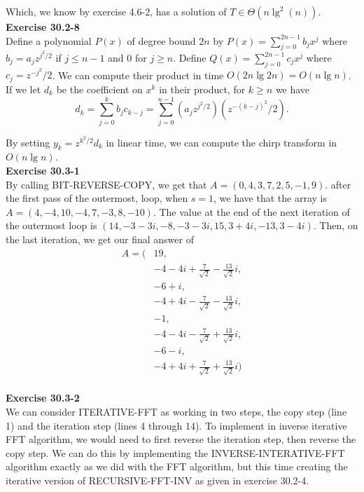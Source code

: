 \documentclass{article}
\begin{document}
Which, we know by exercise 4.6-2, has a solution of $T\in \Theta(n\lg^2(n))$.\\

\noindent\textbf{Exercise 30.2-8}\\

Define a polynomial $P(x)$ of degree bound $2n$ by $P(x) = \sum_{j=0}^{2n-1} b_jx^j$ where $b_j = a_jz^{j^2/2}$ if $j \leq n-1$ and 0 for $j  \geq n$. Define $Q(x) = \sum_{j=0}^{2n-1} c_jx^j$ where $c_j = z^{-j^2}/2$.  We can compute their product in time $O(2n\lg 2n) = O(n \lg n)$. If we let $d_k$ be the coefficient on $x^k$ in their product, for $k \geq n$ we have  
\[d_k = \sum_{j=0}^k b_j c_{k-j} = \sum_{j=0}^{n-1}\left(a_jz^{j^2/2}\right)\left(z^{-(k-j)^2}/2\right).\]

By setting $y_k = z^{k^2/2}d_k$ in linear time, we can compute the chirp transform in $O(n \lg n)$. \\

\noindent\textbf{Exercise 30.3-1}\\

By calling BIT-REVERSE-COPY, we get that $A = (0,4,3,7,2,5,-1,9)$. after the first pass of the outermost, loop, when $s=1$, we have that the array is $A= (4,-4,10,-4,7,-3,8,-10)$. The value at the end of the next iteration of the outermost loop is $(14,-3-3i,-8,-3-3i,15,3+4i,-13,3-4i)$. Then, on the last iteration, we get our final answer of 
\begin{align*}
A = (&19,\\
&-4-4i+\frac{7}{\sqrt{2}} -\frac{13}{\sqrt{2}}i,\\
&-6+i,\\
&-4+4i-\frac{7}{\sqrt{2}} -\frac{13}{\sqrt{2}}i,\\
&-1,\\
&-4-4i-\frac{7}{\sqrt{2}} +\frac{13}{\sqrt{2}}i,\\
&-6-i,\\
&-4+4i+\frac{7}{\sqrt{2}} +\frac{13}{\sqrt{2}}i)
\end{align*}\\

\noindent\textbf{Exercise 30.3-2}\\

We can consider ITERATIVE-FFT as working in two steps, the copy step (line 1) and the iteration step (lines 4 through 14).  To implement in inverse iterative FFT algorithm, we would need to first reverse the iteration step, then reverse the copy step.  We can do this by implementing the INVERSE-INTERATIVE-FFT algorithm exactly as we did with the FFT algorithm, but this time creating the iterative version of RECURSIVE-FFT-INV as given in exercise 30.2-4.  \\
\end{document}
